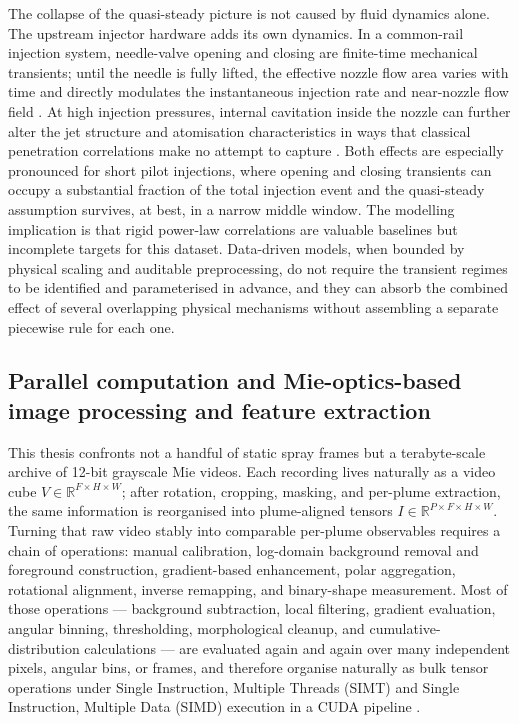 \documentclass[english, 12pt, a4paper, elec, utf8, a-2b, online]{aaltothesis}
\begin{document}
The collapse of the quasi-steady picture is not caused by fluid dynamics alone. 
The upstream injector hardware adds its own dynamics. 
In a common-rail injection system, needle-valve opening and closing are finite-time mechanical transients; 
until the needle is fully lifted, the effective nozzle flow area varies with time 
and directly modulates the instantaneous injection rate and near-nozzle flow field \cite{StumppRicco1996,HiroyasuArai1990}. 
At high injection pressures, internal cavitation inside the nozzle can further alter the jet structure and atomisation characteristics 
in ways that classical penetration correlations make no attempt to capture \cite{liu2020sprayreview}. 
Both effects are especially pronounced for short pilot injections, 
where opening and closing transients can occupy a substantial fraction of the total injection event and the quasi-steady assumption survives, 
at best, in a narrow middle window. 
The modelling implication is that rigid power-law correlations are valuable baselines but incomplete targets for this dataset. 
Data-driven models, when bounded by physical scaling and auditable preprocessing, 
do not require the transient regimes to be identified and parameterised in advance, 
and they can absorb the combined effect of several overlapping physical mechanisms without assembling a separate piecewise rule for each one.

\subsection{Parallel computation and Mie-optics-based image processing and feature extraction}

This thesis confronts not a handful of static spray frames but a terabyte-scale archive of 12-bit grayscale Mie videos.
Each recording lives naturally as a video cube \(V\in\mathbb{R}^{F\times H\times W}\);
after rotation, cropping, masking, and per-plume extraction, the same information is reorganised into plume-aligned tensors
\(I\in\mathbb{R}^{P\times F\times H\times W}\).
Turning that raw video stably into comparable per-plume observables requires a chain of operations:
manual calibration, log-domain background removal and foreground construction, gradient-based enhancement,
polar aggregation, rotational alignment, inverse remapping, and binary-shape measurement.
Most of those operations --- background subtraction, local filtering, gradient evaluation, angular binning, thresholding,
morphological cleanup, and cumulative-distribution calculations --- are evaluated again and again over many independent
pixels, angular bins, or frames, and therefore organise naturally as bulk tensor operations under
Single Instruction, Multiple Threads (SIMT) and Single Instruction, Multiple Data (SIMD) execution in a CUDA pipeline
\cite{NickollsBuckGarlandSkadron2008,GonzalezWoodsDIP,Szeliski2010Vision}.
\end{document}

